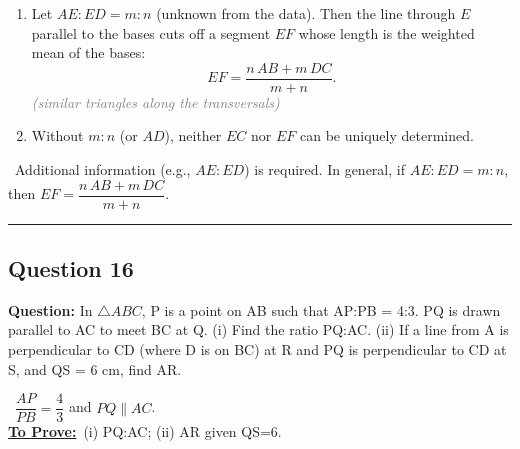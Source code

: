 \documentclass{article}
\newenvironment{steps}{%
  \begin{enumerate}[label=\textcolor{primary}{Step~\arabic*:}, leftmargin=*]
}{\end{enumerate}}
\newcommand{\sul}[1]{\uline{#1}}
\newcommand{\dul}[1]{\uuline{#1}}
\newcommand{\solutionheading}{{\raggedright\dul{\textbf{Solution}}\par}}
\newcommand{\given}[1]{\noindent\textbf{\textcolor{secondary}{\dul{Given:}}}~#1\\}
\newcommand{\toprove}[1]{\noindent\textbf{\textcolor{primary}{\sul{To Prove:}}}~#1\\}
\newcommand{\reason}[1]{\hfill\textit{\textcolor{gray}{(#1)}}}
\newcommand{\solutionrule}{\par\noindent\color{accent}\rule{\linewidth}{0.6pt}\par\smallskip}
\newcommand{\finalanswer}[1]{\noindent\textbf{\textcolor{accent}{\dul{Answer:}}}~#1\solutionrule}
\begin{document}
\begin{center}
\end{center}

\begin{steps}
  \item Let $AE:ED = m:n$ (unknown from the data). Then the line through $E$ parallel to the bases cuts off a segment $EF$ whose length is the weighted mean of the bases:
  \[ EF = \frac{n\,AB + m\,DC}{m+n}. \]
  \reason{similar triangles along the transversals}
  \item Without $m:n$ (or $AD$), neither $EC$ nor $EF$ can be uniquely determined.
\end{steps}

\finalanswer{Additional information (e.g., $AE:ED$) is required. In general, if $AE:ED=m:n$, then $EF=\dfrac{n\,AB + m\,DC}{m+n}$.}

\subsection*{Question 16}
\textbf{Question:} In $\triangle ABC$, P is a point on AB such that AP:PB = 4:3. PQ is drawn parallel to AC to meet BC at Q.
(i) Find the ratio PQ:AC. (ii) If a line from A is perpendicular to CD (where D is on BC) at R and PQ is perpendicular to CD at S, and QS = 6 cm, find AR.

\solutionheading
\given{$\dfrac{AP}{PB}=\dfrac{4}{3}$ and $PQ\parallel AC$.}
\toprove{(i) PQ:AC; (ii) AR given QS=6.}

\begin{center}
\end{center}
\end{document}
